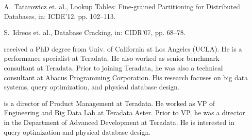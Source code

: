 \documentclass[paper]{ieice}
\begin{document}
\begin{thebibliography}{99}
{
{A.~Tatarowicz et. al.}, {Lookup Tables: Fine-grained Partitioning for Distributed Databases},
  in: ICDE'12, pp. 102--113.

{S.~Idreos et. al.}, {Database Cracking}, in: CIDR'07, pp. 68--78.
}

\vspace{-.8in}



\vspace{-.2in}

{received a PhD degree from Univ. of California at Los \hbox{Angeles} (UCLA).  
He is a performance specialist at Teradata. 
He also worked as senior benchmark consultant at Teradata.
Prior to joining Teradata, he was also a technical \hbox{consultant} at Abacus Programming Corporation. 
His research focuses on big data systems, query optimization, and physical database design.}

{is a director of Product Management at Teradata. 
He worked as VP of Engineering and Big Data Lab at Teradata Aster.
Prior to VP, he was a director in the Department of Advanced Development at Teradata.
He is interested in query optimization and physical database design.}


\end{thebibliography}
\end{document}
